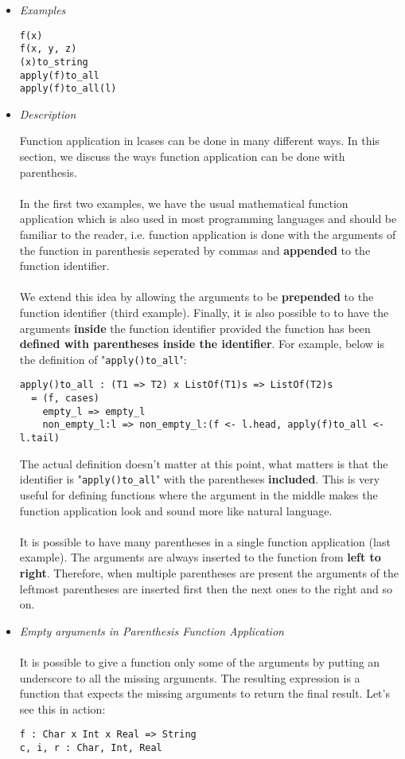 \documentclass{article}
\begin{document}
\begin{itemize}
\item \textit{Examples}

\begin{verbatim}
f(x)
f(x, y, z)
(x)to_string
apply(f)to_all
apply(f)to_all(l)
\end{verbatim}

\item \textit{Description}

Function application in lcases can be done in many different ways. In this
section, we discuss the ways function application can be done with parenthesis.
\\\\
In the first two examples, we have the usual mathematical function application
which is also used in most programming languages and should be familiar to the
reader, i.e. function application is done with the arguments of the function in
parenthesis seperated by commas and \textbf{appended} to the function
identifier.
\\\\
We extend this idea by allowing the arguments to be \textbf{prepended} to the
function identifier (third example). Finally, it is also possible to to have
the arguments \textbf{inside} the function identifier provided the function has
been \textbf{defined with parentheses inside the identifier}. For example,
below is the definition of "\verb|apply()to_all|":

\begin{verbatim}
apply()to_all : (T1 => T2) x ListOf(T1)s => ListOf(T2)s
  = (f, cases)
    empty_l => empty_l
    non_empty_l:l => non_empty_l:(f <- l.head, apply(f)to_all <- l.tail)
\end{verbatim}
The actual definition doesn't matter at this point, what matters is that the
identifier is "\verb|apply()to_all|" with the parentheses \textbf{included}.
This is very useful for defining functions where the argument in the middle
makes the function application look and sound more like natural language.
\\\\
It is possible to have many parentheses in a single function application (last
example). The arguments are always inserted to the function from \textbf{left
to right}.  Therefore, when multiple parentheses are present the arguments of
the leftmost parentheses are inserted first then the next ones to the right and
so on.

\newpage
\item \textit{Empty arguments in Parenthesis Function Application}
\\\\
It is possible to give a function only some of the arguments by putting an
underscore to all the missing arguments. The resulting expression is a function
that expects the missing arguments to return the final result. Let's see
this in action:
\begin{verbatim}
f : Char x Int x Real => String
c, i, r : Char, Int, Real


\end{verbatim}
\end{itemize}
\end{document}
